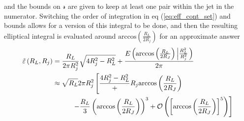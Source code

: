 	and the bounds on $\mathcal{r}$ are given to keep at least one pair within the jet in the numerator. 
	Switching the order of integration in eq (\ref{eq:eff_cont_set}) and bounds allows for a version of this integral to be done, and then the resulting elliptical integral is evaluated around $\textrm{arccos}\left( \frac{R_L}{2R_j} \right)$ for an approximate answer 
	\begin{equation}
		\begin{split}
			\tilde{\varepsilon} \left( R_L, R_j \right) 	&= \frac{R_L}{2 \pi R_j^2} \sqrt{4 R_j^2 - R_L^2} + \frac{E \left( \textrm{arccos} \left( \frac{R_L}{2R_J} \right) \left| \frac{R_L^2}{R_j^2} \right. \right)}{2\pi} \\
									& \approx \sqrt{R_L}{2 \pi R_j^2} \left[ \frac{4 R_j^2 - R_L^2} %
									+ R_j \textrm{arccos} \left( \frac{R_L}{2 R_J} \right) \right. \\ & \left. \hspace{1 cm}- \frac{R_L}{3} \left( \textrm{arccos} \left(\frac{R_L}{2R_J} \right) \right)^3 + \mathcal{O}\left( \left[\textrm{arccos} \left(\frac{R_L}{2R_J} \right) \right]^5 \right) \right]
		\end{split}
		\label{eq:eff_cont}
	\end{equation}
	
